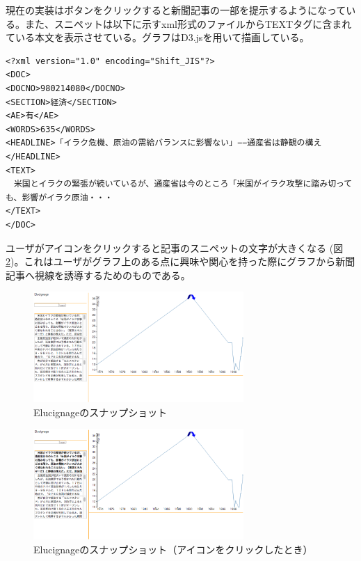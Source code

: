 \documentclass{matsushita-zemi}
\begin{document}
現在の実装はボタンをクリックすると新聞記事の一部を提示するようになっている。また、スニペットは以下に示すxml形式のファイルからTEXTタグに含まれている本文を表示させている。グラフはD3.jsを用いて描画している。
\begin{verbatim}
<?xml version="1.0" encoding="Shift_JIS"?>
<DOC>
<DOCNO>980214080</DOCNO>
<SECTION>経済</SECTION>
<AE>有</AE>
<WORDS>635</WORDS>
<HEADLINE>「イラク危機、原油の需給バランスに影響ない」−−通産省は静観の構え</HEADLINE>
<TEXT>
　米国とイラクの緊張が続いているが、通産省は今のところ「米国がイラク攻撃に踏み切っても、影響がイラク原油・・・
</TEXT>
</DOC>
\end{verbatim}

ユーザがアイコンをクリックすると記事のスニペットの文字が大きくなる (図\ref{Elucignage_click})。これはユーザがグラフ上のある点に興味や関心を持った際にグラフから新聞記事へ視線を誘導するためのものである。

\begin{figure}[tb]
  \begin{center}
   \includegraphics[width=8cm,bb=0 0 852 448]{Elucignageprototype.png}
  \end{center}
 \caption{Elucignageのスナップショット}
 \label{Elucignage}
\end{figure}
\begin{figure}[tb]
  \begin{center}
   \includegraphics[width=8cm,bb=0 0 853 448]{Elucignage_click.png}
  \end{center}
 \caption{Elucignageのスナップショット（アイコンをクリックしたとき）}
 \label{Elucignage_click}
\end{figure}
\end{document}
